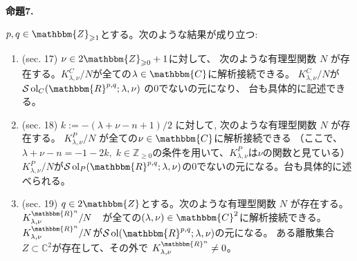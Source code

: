 \documentclass[a4paper]{article} %
\newcommand{\assign}{:=}
\newcommand{\tmop}[1]{\ensuremath{\operatorname{#1}}}
\newcommand{\tmtextbf}[1]{{\bfseries{#1}}}
\newcommand{\tmtextit}[1]{{\itshape{#1}}}
\begin{document}
{\noindent}\tmtextbf{命題\textbf{7}.} \tmtextit{$p, q \in
 \mathbbm{Z}_{\geqslant 1}$とする。次のような結果が成り立つ:
\begin{enumerate}
 \item (sec. 17) $\nu \in 2\mathbbm{Z}_{\geqslant 0}+1$に対して、 次のような有理型関数 $N$ が存在する。$K_{\lambda, \nu}^C / N$が全ての$\lambda \in \mathbbm{C}$に解析接続できる。
 $K_{\lambda, \nu}^C / N$が$\mathcal{S} \tmop{ol}_C ( \mathbbm{R}^{p, q} ; \lambda, \nu)$ の0でないの元になり、
 台も具体的に記述できる。
 
 \item (sec. 18) $k \assign - ( \lambda + \nu - n + 1) / 2$
に対して, 次のような有理型関数 $N$ が存在する。
$K_{\lambda, \nu}^P / N$
が全ての$\nu\in \mathbbm{C}$に解析接続できる 
（ここで、$\lambda+\nu-n=-1-2k,\;k\in\mathbb{Z}_{\ge0}$の条件を用いて、$K_{\lambda, \nu}^P$は$\nu$の関数と見ている）
$K_{\lambda, \nu}^P / N$が$\mathcal{S}\tmop{ol}_P ( \mathbbm{R}^{p, q} ;
 \lambda, \nu)$の0でないの元になる。台も具体的に述べられる。
 
 \item (sec. 19) $q \in 2\mathbbm{Z}$とする。次のような有理型関数 $N$ が存在する。$K_{\lambda, \nu}^{\mathbbm{R}^n} / N$　が全ての$(\lambda,\nu) \in \mathbbm{C}^2$に解析接続できる。
$K_{\lambda, \nu}^{\mathbbm{R}^n} / N$が$\mathcal{S}\tmop{ol} ( \mathbbm{R}^{p, q} ;
 \lambda, \nu)$の元になる。
 ある離散集合$Z\subset\mathbb{C}^2$が存在して、その外で
 $K_{\lambda, \nu}^{\mathbbm{R}^n}\neq0$。
\end{enumerate}}{\hspace*{\fill}}{\medskip}
\end{document}
